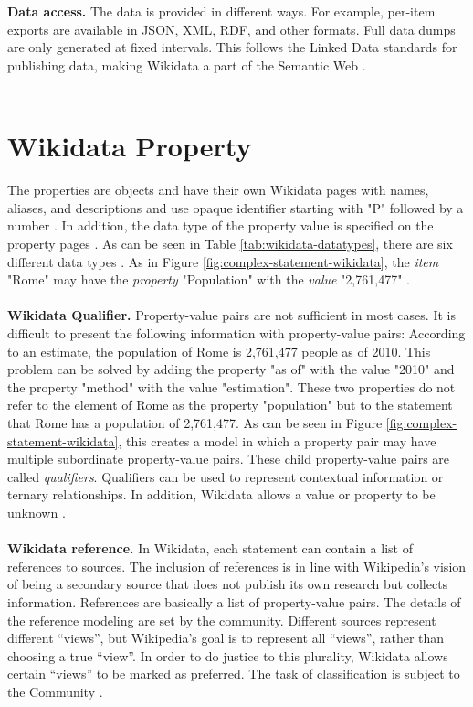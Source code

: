 ﻿\documentclass[11pt,titlepage,oneside,openany]{book}
\begin{document}
\\
\\
\textbf{Data access. } The data is provided in different ways. For example, per-item exports are available in JSON, XML, RDF, and other formats. Full data dumps are only generated at fixed intervals. This follows the Linked Data standards for publishing data, making Wikidata a part of the Semantic Web \cite{AFCK01}.
\\
\\

\section{Wikidata Property}
The properties are objects and have their own Wikidata pages with names, aliases, and descriptions \cite{AFCK01} and use opaque identifier starting with "P" followed by a number \cite{Erxleben2014IntroducingWT}. In addition, the data type of the property value is specified on the property pages \cite{AFCK01}. As can be seen in Table \ref{tab:wikidata-datatypes}, there are six different data types \cite{Erxleben2014IntroducingWT}. As in Figure \ref{fig:complex-statement-wikidata}, the \textit{item} "Rome" may have the \textit{property} "Population" with the \textit{value} "2,761,477" \cite{AFCK01}. 
\\
\\
\textbf{Wikidata Qualifier. } Property-value pairs are not sufficient in most cases. It is difficult to present the following information with property-value pairs: According to an estimate, the population of Rome is 2,761,477 people as of 2010. This problem can be solved by adding the property "as of" with the value "2010" and the property "method" with the value "estimation". These two properties do not refer to the element of Rome as the property "population" but to the statement that Rome has a population of 2,761,477. As can be seen in Figure \ref{fig:complex-statement-wikidata}, this creates a model in which a property pair may have multiple subordinate property-value pairs. These child property-value pairs are called \textit{qualifiers}. Qualifiers can be used to represent contextual information or ternary relationships. In addition, Wikidata allows a value or property to be unknown \cite{AFCK01}.
\\
\\
\textbf{Wikidata reference. } In Wikidata, each statement can contain a list of references to sources. The inclusion of references is in line with Wikipedia's vision of being a secondary source that does not publish its own research but collects information. References are basically a list of property-value pairs. The details of the reference modeling are set by the community. Different sources represent different ``views'', but Wikipedia's goal is to represent all ``views'', rather than choosing a true ``view''. In order to do justice to this plurality, Wikidata allows certain ``views'' to be marked as preferred. The task of classification is subject to the Community \cite{AFCK01}.
\end{document}
